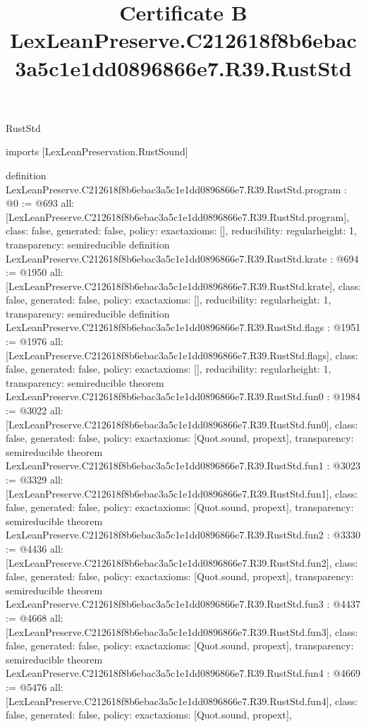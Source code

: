 \begin{lexlean}{RustStd}
\title{Certificate B LexLeanPreserve.C212618f8b6ebac3a5c1e1dd0896866e7.R39.RustStd}
\begin{coremodule}
imports [LexLeanPreservation.RustSound]

definition LexLeanPreserve.C212618f8b6ebac3a5c1e1dd0896866e7.R39.RustStd.program : @0 := @693 {
  all: [LexLeanPreserve.C212618f8b6ebac3a5c1e1dd0896866e7.R39.RustStd.program],
  class: false,
  generated: false,
  policy: exact{axioms: []},
  reducibility: regular{height: 1},
  transparency: semireducible
}
definition LexLeanPreserve.C212618f8b6ebac3a5c1e1dd0896866e7.R39.RustStd.krate : @694 := @1950 {
  all: [LexLeanPreserve.C212618f8b6ebac3a5c1e1dd0896866e7.R39.RustStd.krate],
  class: false,
  generated: false,
  policy: exact{axioms: []},
  reducibility: regular{height: 1},
  transparency: semireducible
}
definition LexLeanPreserve.C212618f8b6ebac3a5c1e1dd0896866e7.R39.RustStd.flags : @1951 := @1976 {
  all: [LexLeanPreserve.C212618f8b6ebac3a5c1e1dd0896866e7.R39.RustStd.flags],
  class: false,
  generated: false,
  policy: exact{axioms: []},
  reducibility: regular{height: 1},
  transparency: semireducible
}
theorem LexLeanPreserve.C212618f8b6ebac3a5c1e1dd0896866e7.R39.RustStd.fun0 : @1984 := @3022 {
  all: [LexLeanPreserve.C212618f8b6ebac3a5c1e1dd0896866e7.R39.RustStd.fun0],
  class: false,
  generated: false,
  policy: exact{axioms: [Quot.sound, propext]},
  transparency: semireducible
}
theorem LexLeanPreserve.C212618f8b6ebac3a5c1e1dd0896866e7.R39.RustStd.fun1 : @3023 := @3329 {
  all: [LexLeanPreserve.C212618f8b6ebac3a5c1e1dd0896866e7.R39.RustStd.fun1],
  class: false,
  generated: false,
  policy: exact{axioms: [Quot.sound, propext]},
  transparency: semireducible
}
theorem LexLeanPreserve.C212618f8b6ebac3a5c1e1dd0896866e7.R39.RustStd.fun2 : @3330 := @4436 {
  all: [LexLeanPreserve.C212618f8b6ebac3a5c1e1dd0896866e7.R39.RustStd.fun2],
  class: false,
  generated: false,
  policy: exact{axioms: [Quot.sound, propext]},
  transparency: semireducible
}
theorem LexLeanPreserve.C212618f8b6ebac3a5c1e1dd0896866e7.R39.RustStd.fun3 : @4437 := @4668 {
  all: [LexLeanPreserve.C212618f8b6ebac3a5c1e1dd0896866e7.R39.RustStd.fun3],
  class: false,
  generated: false,
  policy: exact{axioms: [Quot.sound, propext]},
  transparency: semireducible
}
theorem LexLeanPreserve.C212618f8b6ebac3a5c1e1dd0896866e7.R39.RustStd.fun4 : @4669 := @5476 {
  all: [LexLeanPreserve.C212618f8b6ebac3a5c1e1dd0896866e7.R39.RustStd.fun4],
  class: false,
  generated: false,
  policy: exact{axioms: [Quot.sound, propext]},
}
\end{coremodule}
\end{lexlean}
